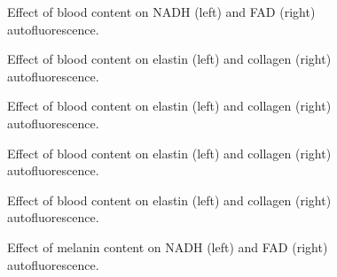 \begin{appendices}
\begin{figure}[!htbp]
    \centering
    \caption{Effect of blood content on NADH (left) and FAD (right) autofluorescence.}%
    \label{fig:450nadhfad-blood}%
\end{figure}


\begin{figure}[!htbp]
    \centering
    \caption{Effect of blood content on elastin (left) and collagen (right) autofluorescence.}%
    \label{fig:260elastincollagen-blood}%
\end{figure}

\begin{figure}[!htbp]
    \centering
    \caption{Effect of blood content on elastin (left) and collagen (right) autofluorescence.}%
    \label{fig:320elastincollagen-blood}%
\end{figure}

\begin{figure}[!htbp]
    \centering
    \caption{Effect of blood content on elastin (left) and collagen (right) autofluorescence.}%
    \label{fig:365elastincollagen-blood}%
\end{figure}

\begin{figure}[!htbp]
    \centering
    \caption{Effect of blood content on elastin (left) and collagen (right) autofluorescence.}%
    \label{fig:450nadhcollagen-blood}%
\end{figure}


\begin{figure}[!htbp]
    \centering
    \caption{Effect of melanin content on NADH (left) and FAD (right) autofluorescence.}%
    \label{fig:260nadhfad-melanin}%
\end{figure}


\end{appendices}
